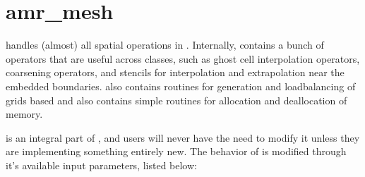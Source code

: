 \documentclass[letterpaper,10pt,english]{sphinxmanual}
\begin{document}
\begin{sphinxVerbatim}[commandchars=\\\{\},formatcom=\scriptsize]
               
              
                   
                 
\end{sphinxVerbatim}


\section{amr\_mesh}
\label{\detokenize{AmrMesh:amr-mesh}}\label{\detokenize{AmrMesh:chap-amr-mesh}}\label{\detokenize{AmrMesh::doc}}
{\hyperref[\detokenize{AmrMesh:chap-amr-mesh}]{}} handles (almost) all spatial operations in .
Internally, {\hyperref[\detokenize{AmrMesh:chap-amr-mesh}]{}} contains a bunch of operators that are useful across classes, such as ghost cell interpolation operators, coarsening operators, and stencils for interpolation and extrapolation near the embedded boundaries. {\hyperref[\detokenize{AmrMesh:chap-amr-mesh}]{}} also contains routines for generation and load\sphinxhyphen{}balancing of grids based and also contains simple routines for allocation and deallocation of memory.

{\hyperref[\detokenize{AmrMesh:chap-amr-mesh}]{}} is an integral part of , and users will never have the need to modify it unless they are implementing something entirely new. The behavior of {\hyperref[\detokenize{AmrMesh:chap-amr-mesh}]{}} is modified through it’s available input parameters, listed below:
\end{document}
